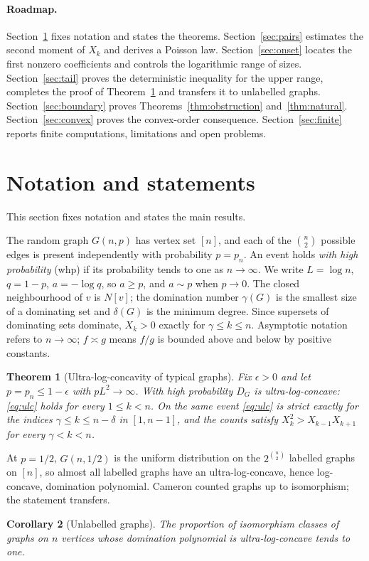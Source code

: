 \documentclass[11pt]{article}
\newtheorem{theorem}{Theorem}[section]
\newtheorem{corollary}[theorem]{Corollary}
\theoremstyle{remark}
\begin{document}
\paragraph{Roadmap.} Section~\ref{sec:results} fixes notation and states the theorems. Section~\ref{sec:pairs} estimates the second moment of $X_k$ and derives a Poisson law. Section~\ref{sec:onset} locates the first nonzero coefficients and controls the logarithmic range of sizes. Section~\ref{sec:tail} proves the deterministic inequality for the upper range, completes the proof of Theorem~\ref{thm:main} and transfers it to unlabelled graphs. Section~\ref{sec:boundary} proves Theorems~\ref{thm:obstruction} and~\ref{thm:natural}. Section~\ref{sec:convex} proves the convex-order consequence. Section~\ref{sec:finite} reports finite computations, limitations and open problems.

\section{Notation and statements}\label{sec:results}
This section fixes notation and states the main results.

The random graph $G(n,p)$ has vertex set $[n]$, and each of the $\binom n2$ possible edges is present independently with probability $p=p_n$. An event holds \emph{with high probability} (whp) if its probability tends to one as $n\to\infty$. We write $L=\log n$, $q=1-p$, $a=-\log q$, so $a\ge p$, and $a\sim p$ when $p\to0$. The closed neighbourhood of $v$ is $N[v]$; the domination number $\gamma(G)$ is the smallest size of a dominating set and $\delta(G)$ is the minimum degree. Since supersets of dominating sets dominate, $X_k>0$ exactly for $\gamma\le k\le n$. Asymptotic notation refers to $n\to\infty$; $f\asymp g$ means $f/g$ is bounded above and below by positive constants.

\begin{theorem}[Ultra-log-concavity of typical graphs]\label{thm:main}
Fix $\epsilon>0$ and let $p=p_n\le1-\epsilon$ with $pL^2\to\infty$. With high probability $D_G$ is ultra-log-concave: \eqref{eq:ulc} holds for every $1\le k<n$. On the same event \eqref{eq:ulc} is strict exactly for the indices $\gamma\le k\le n-\delta$ in $[1,n-1]$, and the counts satisfy $X_k^2>X_{k-1}X_{k+1}$ for every $\gamma<k<n$.
\end{theorem}

At $p=1/2$, $G(n,1/2)$ is the uniform distribution on the $2^{\binom n2}$ labelled graphs on $[n]$, so almost all labelled graphs have an ultra-log-concave, hence log-concave, domination polynomial. Cameron counted graphs up to isomorphism; the statement transfers.
\begin{corollary}[Unlabelled graphs]\label{cor:unlabelled}
The proportion of isomorphism classes of graphs on $n$ vertices whose domination polynomial is ultra-log-concave tends to one.
\end{corollary}
\end{document}
